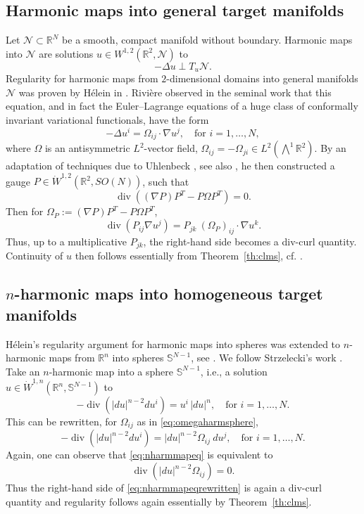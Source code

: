 \documentclass[12pt]{amsart}
\def\S{{\mathbb S}}
\theoremstyle{definition}
\newcommand{\R}{\mathbb{R}}
\newcommand{\Ep}{\bigwedge\nolimits}
\numberwithin{theorem}{section} \numberwithin{equation}{section}
\renewcommand{\div}{\operatorname{div}}
\newcommand{\lap}{\Delta }
\begin{document}
\subsection*{Harmonic maps into general target manifolds}
Let $\mathcal{N} \subset \R^N$ be a smooth, compact manifold without boundary. Harmonic maps into $\mathcal{N}$ are solutions $u \in W^{1,2}(\R^2,\mathcal{N})$ to
\begin{equation}\label{eq:harmmapeqperp}
 -\lap u \perp T_u \mathcal{N}.
\end{equation}
Regularity for harmonic maps from $2$-dimensional domains into general manifolds $\mathcal{N}$ was proven by H\'elein in \cite{Helein91}. Rivi\`{e}re observed in the seminal work \cite{Riviere-2007} that this equation, and in fact the Euler--Lagrange equations of a huge class of conformally invariant variational functionals, have the form
\begin{equation}\label{eq:confoeq}
 -\lap u^i = \Omega_{ij} \cdot \nabla u^j, \quad \mbox{for $i =1,\ldots,N$},
\end{equation}
where $\Omega$ is an antisymmetric $L^2$-vector field, $\Omega_{ij} = - \Omega_{ji} \in L^2(\Ep^1 \R^2)$. By an adaptation of techniques due to Uhlenbeck \cite{Uhlenbeck-1982}, see also \cite{Schikorra-2010}, he then constructed a gauge $P \in \dot{W}^{1,2}(\R^2,SO(N))$, such that
\begin{equation}\label{eq:gaugelocal}
 \div ((\nabla P) P^T - P \Omega P^T) = 0.
\end{equation}
Then for $\Omega_P := (\nabla P) P^T - P \Omega P^T$,
\[
 \div(P_{ij} \nabla u^j) = P_{jk}\ (\Omega_P)_{ij} \cdot \nabla u^k.
\]
Thus, up to a multiplicative $P_{jk}$, the right-hand side becomes a div-curl quantity. Continuity of $u$ then follows essentially from Theorem~\ref{th:clms}, cf. \cite{Riviere-Struwe-2008}.
% 
\subsection*{$n$-harmonic maps into homogeneous target manifolds}
H\'elein's regularity argument for harmonic maps into spheres was extended to $n$-harmonic maps from $\R^n$ into spheres $\S^{N-1}$, see \cite{Fuchs-1993,Takeuchi-1994,Strzelecki-1994}. We follow Strzelecki's work \cite{Strzelecki-1994}. Take an $n$-harmonic map into a sphere $\S^{N-1}$, i.e., a solution $u \in \dot{W}^{1,n}(\R^n,\S^{N-1})$ to
\begin{equation}\label{eq:nharmmapeq}
 -\div(|du|^{n-2} du^i) = u^i\, |du|^n,  \quad \mbox{for $i = 1,\ldots,N$}.
\end{equation}
This can be rewritten, for $\Omega_{ij}$ as in \eqref{eq:omegaharmsphere},
\begin{equation}\label{eq:nharmmapeqrewritten}
 -\div(|du|^{n-2} du^i) =  |du|^{n-2} \Omega_{ij}\ du^j, \quad \mbox{for $i = 1,\ldots,N$}.
\end{equation}
Again, one can observe that \eqref{eq:nharmmapeq} is equivalent to
\[
 \div(|du|^{n-2} \Omega_{ij}) = 0.
\]
Thus the right-hand side of \eqref{eq:nharmmapeqrewritten} is again a div-curl quantity and regularity follows again essentially by Theorem~\ref{th:clms}. 
\end{document}
